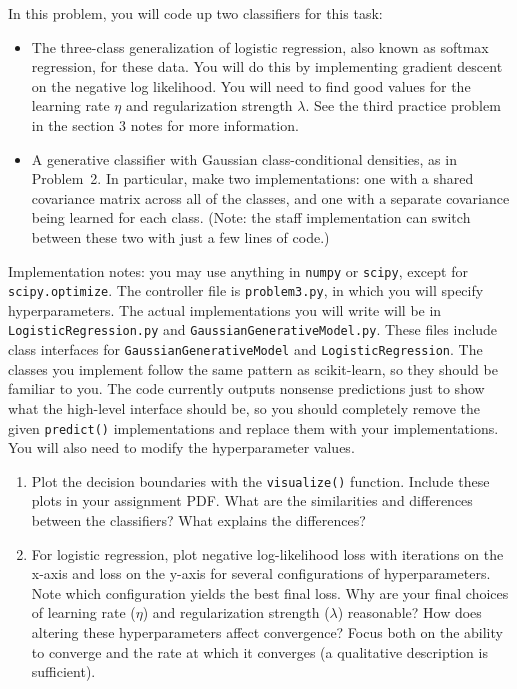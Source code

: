 \documentclass[submit]{harvardml}
\begin{document}
\begin{problem}


In this problem, you will code up two classifiers for this task:
\begin{itemize}
\item The three-class generalization of logistic regression, also
  known as softmax regression, for these data. You will do this by
  implementing gradient descent on the negative log likelihood. You
  will need to find good values for the learning rate $\eta$ and
  regularization strength $\lambda$. See the third practice problem in
  the section 3 notes for more information.

\item A generative classifier with Gaussian class-conditional
  densities, as in Problem~2. In particular, make two implementations:
  one with a shared covariance matrix across all of the classes, and
  one with a separate covariance being learned for each class.  (Note:
  the staff implementation can switch between these two with just a
  few lines of code.)
\end{itemize}

Implementation notes: you may use anything in \texttt{numpy} or
\texttt{scipy}, except for \texttt{scipy.optimize}.  The controller
file is \texttt{problem3.py}, in which you will specify
hyperparameters. The actual implementations you will write will be in
\texttt{LogisticRegression.py} and
\texttt{GaussianGenerativeModel.py}.  These files include class
interfaces for \texttt{GaussianGenerativeModel} and
\texttt{LogisticRegression}. The classes you implement follow the same pattern
as scikit-learn, so they should be familiar to you.  The code
currently outputs nonsense predictions just to show what the
high-level interface should be, so you should completely remove the
given \texttt{predict()} implementations and replace them with your
implementations.  You will also need to modify the hyperparameter
values.

\begin{enumerate}
\item Plot the decision boundaries with the \texttt{visualize()}
  function. Include these plots in your assignment PDF. What are the similarities and differences between the
  classifiers?  What explains the differences?

\item For logistic regression, plot negative log-likelihood loss with
  iterations on the x-axis and loss on the y-axis for several
  configurations of hyperparameters. Note which configuration yields
  the best final loss. Why are your final choices of learning rate
  ($\eta$) and regularization strength ($\lambda$) reasonable? How
  does altering these hyperparameters affect convergence? Focus both
  on the ability to converge and the rate at which it converges (a
  qualitative description is sufficient).


\end{enumerate}
\end{problem}
\end{document}

